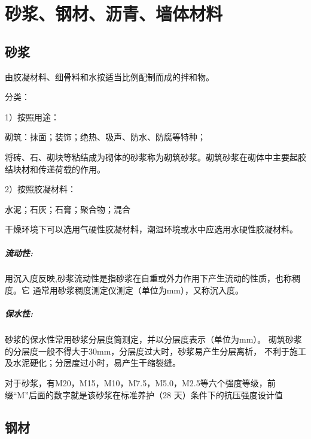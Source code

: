 \documentclass[12pt, a4paper, oneside, UTF8]{ctexbook}
\begin{document}
% 
\else
\fi

\chapter{砂浆、钢材、沥青、墙体材料}

\section{砂浆}
\begin{theorem}
由胶凝材料、细骨料和水按适当比例配制而成的拌和物。

分类：

1）按照用途：

砌筑：抹面；装饰；绝热、吸声、防水、防腐等特种；

将砖、石、砌块等粘结成为砌体的砂浆称为砌筑砂浆。砌筑砂浆在砌体中主要起胶结块材和传递荷载的作用。

2）按照胶凝材料：

水泥；石灰；石膏；聚合物；混合
\end{theorem}

\begin{remark}
    干燥环境下可以选用气硬性胶凝材料，潮湿环境或水中应选用水硬性胶凝材料。
\end{remark}

\paragraph{流动性:}
用沉入度反映,砂浆流动性是指砂浆在自重或外力作用下产生流动的性质，也称稠度。它
通常用砂浆稠度测定仪测定（单位为mm），又称{\color{red}沉入度}。
\paragraph{保水性:}
砂浆的保水性常用砂浆分层度筒测定，并以{\color{red}分层度}表示（单位为mm）。
砌筑砂浆的分层度一般不得大于30mm，分层度过大时，砂浆易产生分层离析，
不利于施工及水泥硬化；分层度过小时，易产生干缩裂缝。

\begin{remark}
    对于砂浆，有M20，M15，M10，M7.5，M5.0，M2.5等六个强度等级，前缀“M”后面的数字就是该砂浆在标准养护（28 天）条件下的抗压强度设计值
\end{remark}

\section{钢材}
\end{document}
